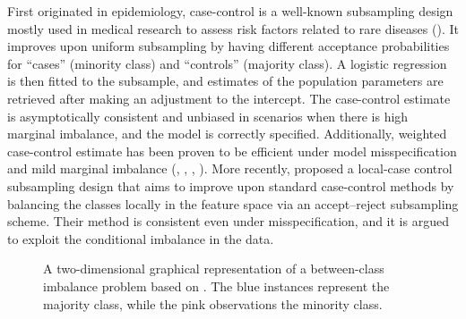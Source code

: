 First originated in epidemiology, case-control is a well-known subsampling design mostly used in medical research to assess risk factors related to rare diseases (\cite{rose2008}). It improves upon uniform subsampling by having different acceptance probabilities for ``cases'' (minority class) and ``controls'' (majority class). A logistic regression is then fitted to the subsample, and estimates of the population parameters are retrieved after making an adjustment to the intercept. The case-control estimate is asymptotically consistent and unbiased in scenarios when there is high marginal imbalance, and the model is correctly specified. Additionally, weighted case-control estimate has been proven to be efficient under model misspecification and mild marginal imbalance (\cite{prentice1979}, \cite{king2001logistic}, \cite{scott1986}, \cite{shen2021surprise}). More recently, \textcite{hastie2014} proposed a local-case control subsampling design that aims to improve upon standard case-control methods by balancing the classes locally in the feature space via an accept–reject subsampling scheme. Their method is consistent even under misspecification, and it is argued to exploit the conditional imbalance in the data.


 

\begin{figure}[ht]
  \centering
    \scalebox{0.4}{}
    \caption[Graphical example of the between-class imbalance problem.]{A two-dimensional graphical representation of a between-class imbalance problem based on \cite{he2019}. The blue instances represent the majority class, while the pink observations the minority class.}
    \label{fig:imbalance}
\end{figure}

